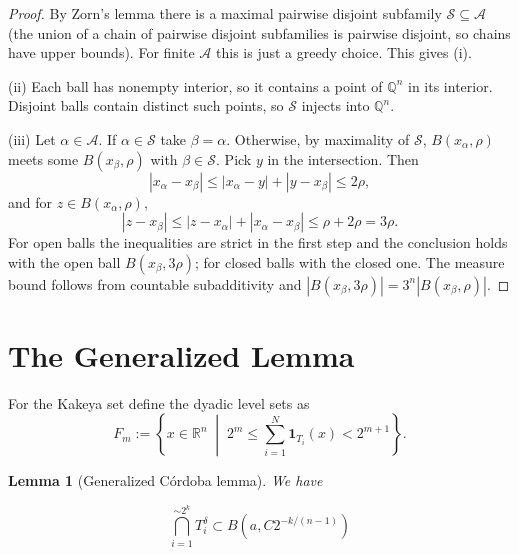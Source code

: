 \documentclass[11pt, letterpaper]{nyjm}
\newtheorem{lemma}[theorem]{Lemma}
\newcommand{\R}{\mathbb{R}}
\begin{document}
	\begin{proof}
		By Zorn's lemma there is a maximal pairwise disjoint subfamily $\mathcal S\subseteq\mathcal A$
		(the union of a chain of pairwise disjoint subfamilies is pairwise disjoint, so chains have upper
		bounds). For finite $\mathcal A$ this is just a greedy choice. This gives (i).
		
		(ii) Each ball has nonempty interior, so it contains a point of $\mathbb Q^n$ in its interior.
		Disjoint balls contain distinct such points, so $\mathcal S$ injects into $\mathbb Q^n$.
		
		(iii) Let $\alpha\in\mathcal A$. If $\alpha\in\mathcal S$ take $\beta=\alpha$. Otherwise, by maximality of
		$\mathcal S$, $B(x_\alpha,\rho)$ meets some $B(x_\beta,\rho)$ with $\beta\in\mathcal S$. Pick $y$ in the
		intersection. Then
		\[
		|x_\alpha-x_\beta|\le|x_\alpha-y|+|y-x_\beta|\le2\rho,
		\]
		and for $z\in B(x_\alpha,\rho)$,
		\[
		|z-x_\beta|\le|z-x_\alpha|+|x_\alpha-x_\beta|\le\rho+2\rho=3\rho .
		\]
		For open balls the inequalities are strict in the first step and the conclusion holds with the
		open ball $B(x_\beta,3\rho)$; for closed balls with the closed one. The measure bound follows from
		countable subadditivity and $|B(x_\beta,3\rho)|=3^n|B(x_\beta,\rho)|$.
	\end{proof}
	\section{The Generalized Lemma}
	
	For the Kakeya set define the  dyadic level sets as 
	\[
	F_m := \left\{ x \in \R^n \;\middle|\; 2^{m} \leq \sum_{i=1}^{N}
	\mathbf{1}_{T_i}(x) < 2^{m+1} \right\}.
	\]
	
	\begin{lemma}[Generalized C\'ordoba lemma] \label{lem:corgeneralized}
		We have 
		
		\[
		\bigcap_{i=1}^{\sim 2^{k}} T_i^{\delta} \subset B(a,C2^{-k/(n-1)})  
		\]
	\end{lemma}
	
\end{document}
